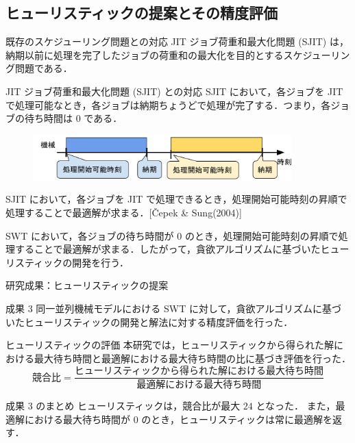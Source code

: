 \documentclass[dvipdfmx]{beamer}
\begin{document}
    \subsection{ヒューリスティックの提案とその精度評価}
    \begin{frame}{既存のスケジューリング問題との対応}
      JIT ジョブ荷重和最大化問題 (SJIT) は，納期以前に処理を完了したジョブの荷重和の最大化を目的とするスケジューリング問題である．
      \begin{block}{JIT ジョブ荷重和最大化問題 (SJIT) との対応}
        SJIT において，各ジョブを JIT で処理可能なとき，各ジョブは納期ちょうどで処理が完了する．つまり，各ジョブの待ち時間は $0$ である．
        \vspace{-2mm}
        \begin{figure}[h]
          \centering
          \includegraphics[width=10cm]{figure/SJIT1.pdf}
        \end{figure}
        \vspace{-2mm}
        SJIT において，各ジョブを JIT で処理できるとき，処理開始可能時刻の昇順で処理することで最適解が求まる．[\v{C}epek \& Sung(2004)]
      \end{block}
      \begin{block}{}
        SWT において，各ジョブの待ち時間が $0$ のとき，処理開始可能時刻の昇順で処理することで最適解が求まる．したがって，貪欲アルゴリズムに基づいたヒューリスティックの開発を行う．
      \end{block}
    \end{frame}

    \begin{frame}{研究成果：ヒューリスティックの提案}
      \begin{alertblock}{成果 3}
        同一並列機械モデルにおける SWT に対して，貪欲アルゴリズムに基づいたヒューリスティックの開発と解法に対する精度評価を行った．
      \end{alertblock}
      \begin{block}{ヒューリスティックの評価}
        本研究では，ヒューリスティックから得られた解における最大待ち時間と最適解における最大待ち時間の比に基づき評価を行った．
        $${\displaystyle \text{競合比} = \frac{\text{ヒューリスティックから得られた解における最大待ち時間}}{\text{最適解における最大待ち時間}}}$$
      \end{block}
      \begin{alertblock}{成果 3 のまとめ}
        ヒューリスティックは，競合比が最大 $24$ となった．
        また，最適解における最大待ち時間が $0$ のとき，ヒューリスティックは常に最適解を返す．
      \end{alertblock}
    \end{frame}
\end{document}
